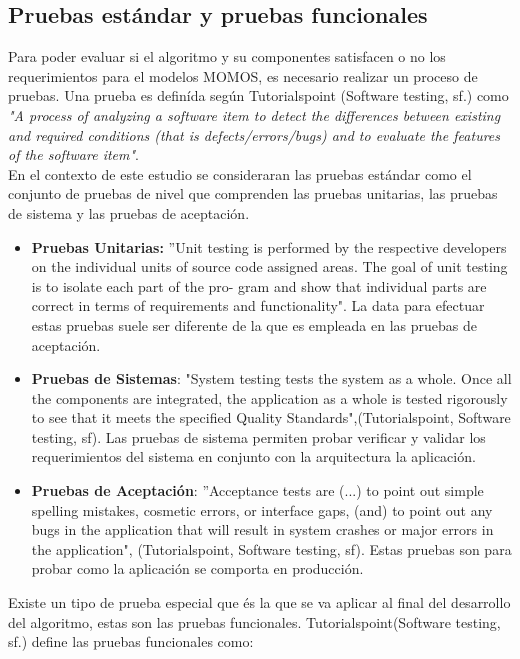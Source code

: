 \subsection{Pruebas estándar y pruebas funcionales}

Para poder evaluar si el algoritmo y su componentes satisfacen o no los requerimientos para el modelos MOMOS, es necesario realizar un proceso de pruebas. Una prueba es definída según Tutorialspoint (Software testing, sf.) como \textit{"A process of analyzing a software item to detect the differences between existing and required conditions (that is defects/errors/bugs) and to evaluate the features of the software item"}.\\

En el contexto de este estudio se consideraran las pruebas estándar como el conjunto de pruebas de nivel que comprenden las pruebas unitarias, las pruebas de sistema y las pruebas de aceptación.\\

\begin{itemize}
	\item \textbf{Pruebas Unitarias:} ”Unit testing is performed by the respective developers on the individual units of source code assigned areas. The goal of unit testing is to isolate each part of the pro- gram and show that individual parts are correct in terms of requirements and functionality". La data para efectuar estas pruebas suele ser diferente de la que es empleada en las pruebas de aceptación.
	\item \textbf{Pruebas de Sistemas}: "System testing tests the system as a whole. Once all the components are integrated, the application as a whole is tested rigorously to see that it meets the specified Quality Standards",(Tutorialspoint, Software testing, sf). Las pruebas de sistema permiten probar verificar y validar los requerimientos del sistema en conjunto con la arquitectura la aplicación.
	\item \textbf{Pruebas de Aceptación}: ”Acceptance tests are (...) to point out simple spelling mistakes, cosmetic errors, or interface gaps, (and) to point out any bugs in the application that will result in system crashes or major errors in the application", (Tutorialspoint, Software testing, sf). Estas pruebas son para probar como la aplicación se comporta en producción.
\end{itemize}

Existe un tipo de prueba especial que és la que se va aplicar al final del desarrollo del algoritmo, estas son las pruebas funcionales. Tutorialspoint(Software testing, sf.) define las pruebas funcionales como:

